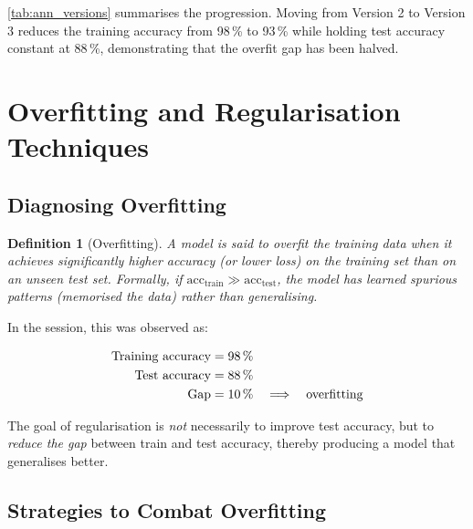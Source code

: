 \documentclass[12pt,a4paper]{article}
\newtheorem{definition}{Definition}[section]
\begin{document}
\cref{tab:ann_versions} summarises the progression.  Moving from Version 2
to Version 3 reduces the training accuracy from 98\,\% to 93\,\% while
holding test accuracy constant at 88\,\%, demonstrating that the overfit
gap has been halved.

\section{Overfitting and Regularisation Techniques}
\label{sec:regularisation}

\subsection{Diagnosing Overfitting}
\label{sec:regularisation:diagnosis}

\begin{definition}[Overfitting]
  \label{def:overfitting}
  A model is said to \emph{overfit} the training data when it achieves
  significantly higher accuracy (or lower loss) on the training set than on
  an unseen test set.  Formally, if $\text{acc}_{\text{train}} \gg
  \text{acc}_{\text{test}}$, the model has learned spurious patterns
  (memorised the data) rather than generalising.
\end{definition}

In the session, this was observed as:

\begin{align}
  \text{Training accuracy} &= 98\,\% \notag \\
  \text{Test accuracy}     &= 88\,\% \notag \\
  \text{Gap}               &= 10\,\% \quad \Longrightarrow \quad \text{overfitting}
  \label{eq:overfit_gap}
\end{align}

\begin{keyinsight}
  The goal of regularisation is \emph{not} necessarily to improve test
  accuracy, but to \emph{reduce the gap} between train and test accuracy,
  thereby producing a model that generalises better.
\end{keyinsight}

\subsection{Strategies to Combat Overfitting}
\label{sec:regularisation:strategies}
\end{document}

